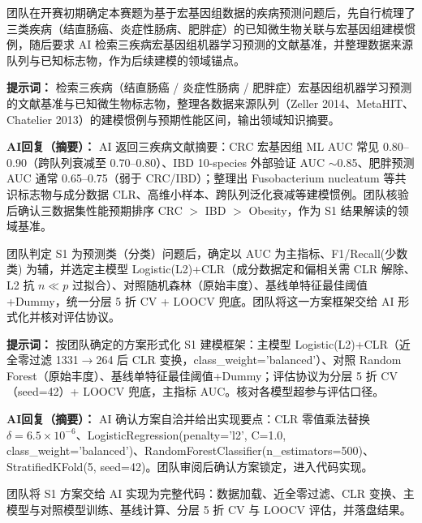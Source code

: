 \documentclass[12pt,a4paper]{ctexart}
\begin{document}
\begin{description}[leftmargin=*, itemindent=0pt, labelwidth=*, labelsep=0.5em]

\item[\textbf{交互记录 [AI-1-1] —— 领域知识整理与知识检索}]

团队在开赛初期确定本赛题为基于宏基因组数据的疾病预测问题后，先自行梳理了三类疾病（结直肠癌、炎症性肠病、肥胖症）的已知微生物关联与宏基因组建模惯例，随后要求 AI 检索三疾病宏基因组机器学习预测的文献基准，并整理数据来源队列与已知标志物，作为后续建模的领域锚点。

\textbf{提示词：} 检索三疾病（结直肠癌 / 炎症性肠病 / 肥胖症）宏基因组机器学习预测的文献基准与已知微生物标志物，整理各数据来源队列（Zeller 2014、MetaHIT、Chatelier 2013）的建模惯例与预期性能区间，输出领域知识摘要。

\textbf{AI回复（摘要）：} AI 返回三疾病文献摘要：CRC 宏基因组 ML AUC 常见 0.80--0.90（跨队列衰减至 0.70--0.80）、IBD 10-species 外部验证 AUC $\sim$0.85、肥胖预测 AUC 通常 0.65--0.75（弱于 CRC/IBD）；整理出 Fusobacterium nucleatum 等共识标志物与成分数据 CLR、高维小样本、跨队列泛化衰减等建模惯例。团队核验后确认三数据集性能预期排序 CRC $>$ IBD $>$ Obesity，作为 S1 结果解读的领域基准。

\item[\textbf{交互记录 [AI-1-2] —— S1 方案设计}]

团队判定 S1 为预测类（分类）问题后，确定以 AUC 为主指标、F1/Recall(少数类) 为辅，并选定主模型 Logistic(L2)+CLR（成分数据定和偏相关需 CLR 解除、L2 抗 $n\ll p$ 过拟合）、对照随机森林（原始丰度）、基线单特征最佳阈值+Dummy，统一分层 5 折 CV + LOOCV 兜底。团队将这一方案框架交给 AI 形式化并核对评估协议。

\textbf{提示词：} 按团队确定的方案形式化 S1 建模框架：主模型 Logistic(L2)+CLR（近全零过滤 1331$\to$264 后 CLR 变换，class\_weight='balanced'）、对照 Random Forest（原始丰度）、基线单特征最佳阈值+Dummy；评估协议为分层 5 折 CV（seed=42）+ LOOCV 兜底，主指标 AUC。核对各模型超参与评估口径。

\textbf{AI回复（摘要）：} AI 确认方案自洽并给出实现要点：CLR 零值乘法替换 $\delta=6.5\times10^{-6}$、LogisticRegression(penalty='l2', C=1.0, class\_weight='balanced')、RandomForestClassifier(n\_estimators=500)、StratifiedKFold(5, seed=42)。团队审阅后确认方案锁定，进入代码实现。

\item[\textbf{交互记录 [AI-1-3] —— S1 建模实现}]

团队将 S1 方案交给 AI 实现为完整代码：数据加载、近全零过滤、CLR 变换、主模型与对照模型训练、基线计算、分层 5 折 CV 与 LOOCV 评估，并落盘结果。


\end{description}
\end{document}
